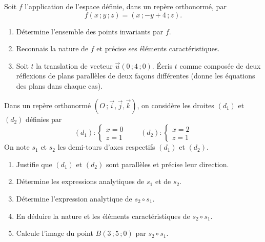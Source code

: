 \documentclass[11pt]{article}
\begin{document}
\begin{exercice}
Soit $f$ l'application de l'espace définie, dans un repère orthonormé, par
\[ f(x\,;y\,;z)=(x\,;-y+4\,;z). \]
\begin{enumerate}
\item Détermine l'ensemble des points invariants par $f$.
\item Reconnais la nature de $f$ et précise ses éléments caractéristiques.
\item Soit $t$ la translation de vecteur $\vec{u}(0\,;4\,;0)$. Écris $t$ comme composée de deux réflexions de plans parallèles de deux façons différentes (donne les équations des plans dans chaque cas).
\end{enumerate}
\end{exercice}

\begin{exercice}
Dans un repère orthonormé $(O\,;\vec{i},\vec{j},\vec{k})$, on considère les droites $(d_1)$ et $(d_2)$ définies par
\[ (d_1):\begin{cases} x=0 \\ z=1 \end{cases} \qquad (d_2):\begin{cases} x=2 \\ z=1 \end{cases} \]
On note $s_1$ et $s_2$ les demi-tours d'axes respectifs $(d_1)$ et $(d_2)$.
\begin{enumerate}
\item Justifie que $(d_1)$ et $(d_2)$ sont parallèles et précise leur direction.
\item Détermine les expressions analytiques de $s_1$ et de $s_2$.
\item Détermine l'expression analytique de $s_2 \circ s_1$.
\item En déduire la nature et les éléments caractéristiques de $s_2 \circ s_1$.
\item Calcule l'image du point $B(3\,;5\,;0)$ par $s_2 \circ s_1$.
\end{enumerate}
\end{exercice}
\end{document}
